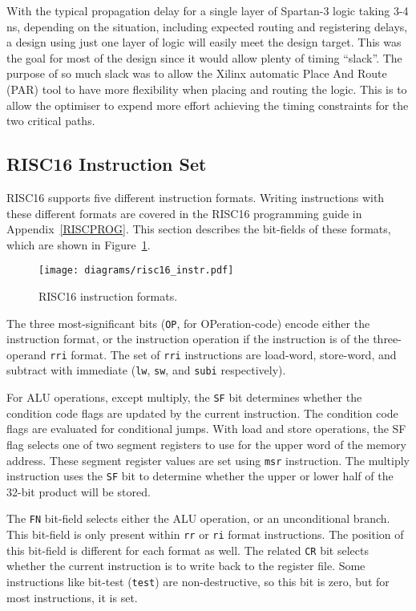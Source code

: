 With the typical propagation delay for a single layer of Spartan-3 logic taking
3-4 ns, depending on the situation, including expected routing and registering
delays, a design using just one layer of logic will easily meet the design
target. This was the goal for most of the design since it would allow plenty of
timing ``slack''. The purpose of so much slack was to allow the Xilinx automatic
Place And Route (PAR) tool to have more flexibility when placing and routing the
logic. This is to allow the optimiser to expend more effort achieving the timing
constraints for the two critical paths.


\subsection{RISC16 Instruction Set}
RISC16 supports five different instruction formats. Writing instructions with
these different formats are covered in the RISC16 programming guide in
Appendix~\ref{RISCPROG}. This section describes the bit-fields of these formats,
which are shown in Figure~\ref{RISC16_Instructions}.

\begin{figure}[h!]
\begin{center}
\texttt{[image: diagrams/risc16\_instr.pdf]}
\caption[RISC16 instruction formats]{RISC16 instruction formats.}
\label{RISC16_Instructions}
\end{center}
\end{figure}

The three most-significant bits (\texttt{OP}, for OPeration-code) encode either
the instruction format, or the instruction operation if the instruction is of
the three-operand \texttt{rri} format. The set of \texttt{rri} instructions are
load-word, store-word, and subtract with immediate (\texttt{lw}, \texttt{sw}, and
\texttt{subi} respectively).

For ALU operations, except multiply, the \texttt{SF} bit determines whether the
condition code flags are updated by the current instruction. The condition code
flags are evaluated for conditional jumps. With load and store operations, the SF
flag selects one of two segment registers to use for the upper word of the memory
address. These segment register values are set using \texttt{msr} instruction.
The multiply instruction uses the \texttt{SF} bit to determine whether the upper
or lower half of the 32-bit product will be stored.

The \texttt{FN} bit-field selects either the ALU operation, or an unconditional
branch. This bit-field is only present within \texttt{rr} or \texttt{ri} format
instructions. The position of this bit-field is different for each format as
well. The related \texttt{CR} bit selects whether the current instruction is to
write back to the register file. Some instructions like bit-test (\texttt{test})
are non-destructive, so this bit is zero, but for most instructions, it is set.

